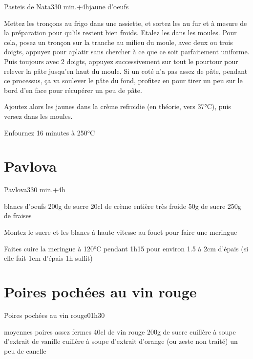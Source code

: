 {\begin{recette}{Pasteis de Nata}{3}{30 min.+4h}{jaune d'oeufs}
\begin{preparation}
Mettez les tronçons au frigo dans une assiette, et sortez les au fur et à mesure de la préparation pour qu'ils restent bien froids.
\etape Etalez les dans les moules. Pour cela, posez un tronçon sur la tranche au milieu du moule, avec deux ou trois doigts, appuyez pour aplatir sans chercher à ce que ce soit parfaitement uniforme. Puis toujours avec 2 doigts, appuyez successivement sur tout le pourtour pour relever la pâte jusqu'en haut du moule. Si un coté n'a pas assez de pâte, pendant ce processus, ça va soulever le pâte du fond, profitez en pour tirer un peu sur le bord d'en face pour récupérer un peu de pâte. 

\etape Ajoutez alors les jaunes dans la crème refroidie (en théorie, vers 37°C), puis versez dans les moules. 
\end{preparation}
\begin{cuisson}
Enfournez 16 minutes à 250°C
\end{cuisson}
\end{recette}

\section{Pavlova}
\begin{recette}{Pavlova}{3}{30 min.+4h}{}
\begin{ingredients}
\ingredient[meringue]
 blancs d'oeufs
\ingredient 200g de sucre
\ingredient[chantilly]
\ingredient 20cl de crème entière très froide
\ingredient 50g de sucre
\ingredient[garniture]
\ingredient 250g de fraises
\end{ingredients}

\begin{preparation}
\etape Montez le sucre et les blancs à haute vitesse au fouet pour faire une meringue
\end{preparation}
\begin{cuisson}
Faites cuire la meringue à 120°C pendant 1h15  pour environ 1.5 à 2cm d'épais (si elle fait 1cm d'épais 1h suffit)
\end{cuisson}
\end{recette}

\section{Poires pochées au vin rouge}
\begin{recette}{Poires pochées au vin rouge}{0}{1h30}{}
\begin{ingredients}
 moyennes poires assez fermes
\ingredient 40cl de vin rouge
\ingredient 200g de sucre
 cuillère à soupe d'extrait de vanille
 cuillère à soupe d'extrait d'orange (ou zeste non traité)
\ingredient un peu de canelle
\end{ingredients}


\end{recette}}

